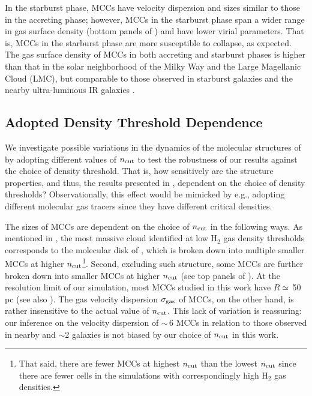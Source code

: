 \IfFileExists{emulateapjlegacy.cls}{\documentclass[iop]{emulateapjlegacy}}{\documentclass[iop]{emulateapj}}
\begin{document}
In the starburst phase, MCCs have velocity dispersion and sizes similar to those in the accreting phase; however, MCCs in the starburst phase span a wider range in gas surface density (bottom panels of ) and have lower virial parameters.
%
That is, MCCs in the starburst phase are more susceptible to collapse, as expected. The gas surface density of MCCs in both accreting and starburst phases is higher than that in the solar neighborhood of the Milky Way and the Large Magellanic Cloud (LMC), but comparable to those observed in starburst galaxies and the nearby ultra-luminous IR galaxies \citep[ULIRGS;][]{Boulares90a, Scoville91a, Weiss01a, Hughes10a, Leroy15a}.
%

\subsection{Adopted Density Threshold Dependence}\label{sec:ncut}

We investigate possible variations in the dynamics of the molecular structures of \flower by adopting different values of $n_{\rm cut}$ to test the robustness of our results against the choice of density threshold.
That is, how sensitively are the structure properties, and thus, the results presented in , dependent on the choice of density thresholds? 
Observationally, this effect would be mimicked by e.g., adopting different molecular gas tracers since they have different critical densities. 

The sizes of MCCs are dependent on the choice of $n_{\rm cut}$ in the following ways. As mentioned in , the most massive cloud identified at low H$_2$ gas density thresholds corresponds to the molecular disk of \flower, which is broken down into multiple smaller MCCs at higher $n_{\rm cut}$\footnote{That said, there are fewer MCCs at highest $n_{\rm cut}$ than the lowest $n_{\rm cut}$ since there are fewer cells in the simulations with correspondingly high H$_2$ gas densities.}.
%
Second, excluding such structure, some MCCs are further broken down into smaller MCCs at higher $n_{\rm cut}$ (see top panels of ). At the resolution limit of our simulation, most MCCs studied in this work have $R\simeq$\,50\,pc (see also ).
%
The gas velocity dispersion $\sigma_{\rm gas}$ of MCCs, on the other hand, is rather insensitive to the actual value of $n_{\rm cut}$. This lack of variation is reassuring: our inference on the velocity dispersion of \z$\sim$\,6 MCCs in relation to those observed in nearby and \z$\sim$2 galaxies is not biased by our choice of $n_{\rm cut}$ in this work.
\end{document}
